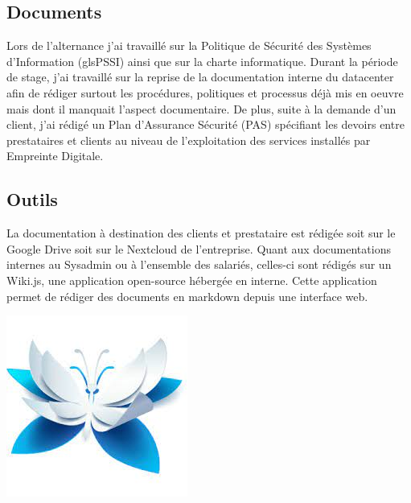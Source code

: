 \documentclass[12pt]{article}
\begin{document}
\subsection{Documents}
Lors de l'alternance j'ai travaillé sur la Politique de Sécurité des Systèmes d'Information (gls{PSSI}) ainsi que sur la charte informatique. 
Durant la période de stage, j'ai travaillé sur la reprise de la documentation interne du datacenter afin de rédiger surtout les procédures, politiques et processus déjà mis en oeuvre mais dont il manquait l'aspect documentaire.
De plus, suite à la demande d'un client, j'ai rédigé un Plan d'Assurance Sécurité (\gls{PAS}) spécifiant les devoirs entre prestataires et clients au niveau de l'exploitation des services installés par Empreinte Digitale.

\subsection{Outils}

\noindent%
\begin{minipage}{.7\textwidth}%
La documentation à destination des clients et prestataire est rédigée soit sur le Google Drive soit sur le \gls{Nextcloud} de l'entreprise. 
Quant aux documentations internes au Sysadmin ou à l'ensemble des salariés, celles-ci sont rédigés sur un Wiki.js, une application open-source hébergée en interne. 
Cette application permet de rédiger des documents en markdown depuis une interface web.

\end{minipage}%
\hfill
\begin{minipage}{.3\textwidth}%
\begin{center}
\includegraphics[width=.6\textwidth]{src/logo_wikijs.jpeg}
\end{center}
\end{minipage}%
\end{document}
